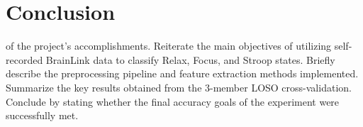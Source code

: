 \section{Conclusion}\label{sec:conclusion}

 of the project's accomplishments. Reiterate the main objectives of utilizing self-recorded BrainLink data to classify Relax, Focus, and Stroop states. Briefly describe the preprocessing pipeline and feature extraction methods implemented. Summarize the key results obtained from the 3-member LOSO cross-validation. Conclude by stating whether the final accuracy goals of the experiment were successfully met.